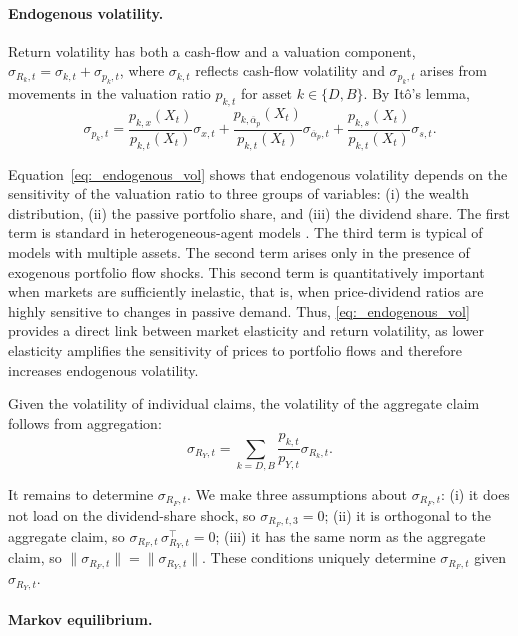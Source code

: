 \documentclass[12pt,english]{article}
\begin{document}
\paragraph{Endogenous volatility.} 

Return volatility has both a cash-flow and a valuation component, $\sigma_{R_k,t} = \sigma_{k,t} + \sigma_{p_k,t}$, where $\sigma_{k,t}$ reflects cash-flow volatility and $\sigma_{p_k,t}$ arises from movements in the valuation ratio $p_{k,t}$ for asset $k \in \{D,B\}$. 
By It\^{o}'s lemma,  
\begin{equation}\label{eq:_endogenous_vol}
    \sigma_{p_k,t} = \frac{p_{k,x}(X_t)}{p_{k,t}(X_t)} \sigma_{x,t} 
    + \frac{p_{k,\overline{\alpha}_p}(X_t)}{p_{k,t}(X_t)} \sigma_{\overline{\alpha}_p,t} 
    + \frac{p_{k,s}(X_t)}{p_{k,t}(X_t)} \sigma_{s,t}.
\end{equation}

Equation~\eqref{eq:_endogenous_vol} shows that endogenous volatility depends on the sensitivity of the valuation ratio to three groups of variables: (i) the wealth distribution, (ii) the passive portfolio share, and (iii) the dividend share.
The first term is standard in heterogeneous-agent models \citep[see][]{panageas2020implications}.
The third term is typical of models with multiple assets.
The second term arises only in the presence of exogenous portfolio flow shocks.
This second term is quantitatively important when markets are sufficiently inelastic, that is, when price-dividend ratios are highly sensitive to changes in passive demand.
Thus, \eqref{eq:_endogenous_vol} provides a direct link between market elasticity and return volatility, as lower elasticity amplifies the sensitivity of prices to portfolio flows and therefore increases endogenous volatility.

Given the volatility of individual claims, the volatility of the aggregate claim follows from aggregation:
\[
\sigma_{R_Y,t} = \sum_{k=D,B} \frac{p_{k,t}}{p_{Y,t}} \sigma_{R_{k},t}.
\]

It remains to determine $\sigma_{R_F,t}$.  
We make three assumptions about $\sigma_{R_F,t}$:
(i) it does not load on the dividend-share shock, so $\sigma_{R_F,t,3} = 0$;
(ii) it is orthogonal to the aggregate claim, so $\sigma_{R_F,t}\,\sigma_{R_Y,t}^\top = 0$;
(iii) it has the same norm as the aggregate claim, so $\|\sigma_{R_F,t}\| = \|\sigma_{R_Y,t}\|$. 
These conditions uniquely determine $\sigma_{R_F,t}$ given $\sigma_{R_Y,t}$.

\paragraph{Markov equilibrium.} 
\end{document}
